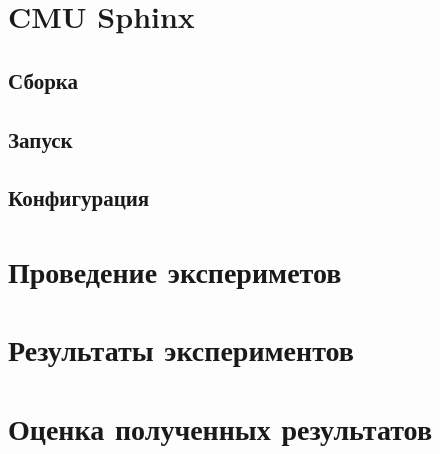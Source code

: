 \section{CMU Sphinx}
\subsection{Сборка}
\subsection{Запуск}
\subsection{Конфигурация}

\section{Проведение экспериметов}
\section{Результаты экспериментов}
\section{Оценка полученных результатов}
